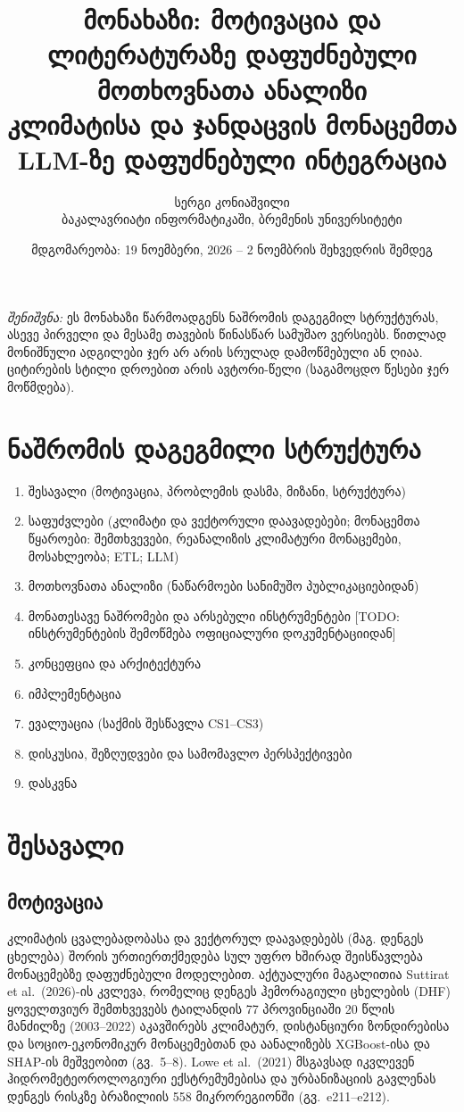\documentclass[11pt,a4paper]{article}
\title{მონახაზი: მოტივაცია და ლიტერატურაზე დაფუძნებული მოთხოვნათა ანალიზი\\[0.3em]
\large კლიმატისა და ჯანდაცვის მონაცემთა LLM-ზე დაფუძნებული ინტეგრაცია}
\author{სერგი კონიაშვილი\\ ბაკალავრიატი ინფორმატიკაში, ბრემენის უნივერსიტეტი}
\date{მდგომარეობა: 19 ნოემბერი, 2026 -- 2 ნოემბრის შეხვედრის შემდეგ}
\newcommand{\todo}[1]{\textcolor{red!70!black}{[TODO: #1]}}
\begin{document}
\maketitle

\noindent\textit{შენიშვნა:} ეს მონახაზი წარმოადგენს ნაშრომის დაგეგმილ სტრუქტურას,
ასევე პირველი და მესამე თავების წინასწარ სამუშაო ვერსიებს. წითლად მონიშნული
ადგილები ჯერ არ არის სრულად დამოწმებული ან ღიაა. ციტირების სტილი დროებით
არის ავტორი-წელი (საგამოცდო წესები ჯერ მოწმდება).

\section*{ნაშრომის დაგეგმილი სტრუქტურა}
\begin{enumerate}[nosep]
  \item შესავალი (მოტივაცია, პრობლემის დასმა, მიზანი, სტრუქტურა)
  \item საფუძვლები (კლიმატი და ვექტორული დაავადებები; მონაცემთა წყაროები:
        შემთხვევები, რეანალიზის კლიმატური მონაცემები, მოსახლეობა; ETL; LLM)
  \item მოთხოვნათა ანალიზი (ნაწარმოები სანიმუშო პუბლიკაციებიდან)
  \item მონათესავე ნაშრომები და არსებული ინსტრუმენტები \todo{ინსტრუმენტების შემოწმება ოფიციალური დოკუმენტაციიდან}
  \item კონცეფცია და არქიტექტურა
  \item იმპლემენტაცია
  \item ევალუაცია (საქმის შესწავლა CS1--CS3)
  \item დისკუსია, შეზღუდვები და სამომავლო პერსპექტივები
  \item დასკვნა
\end{enumerate}

\section{შესავალი}

\subsection{მოტივაცია}

კლიმატის ცვალებადობასა და ვექტორულ დაავადებებს (მაგ. დენგეს ცხელება) შორის
ურთიერთქმედება სულ უფრო ხშირად შეისწავლება მონაცემებზე დაფუძნებული მოდელებით.
აქტუალური მაგალითია Suttirat et al.\ (2026)-ის კვლევა, რომელიც დენგეს ჰემორაგიული
ცხელების (DHF) ყოველთვიურ შემთხვევებს ტაილანდის 77 პროვინციაში 20 წლის მანძილზე
(2003--2022) აკავშირებს კლიმატურ, დისტანციური ზონდირებისა და სოციო-ეკონომიკურ
მონაცემებთან და აანალიზებს XGBoost-ისა და SHAP-ის მეშვეობით (გვ.~5--8). Lowe et al.\
(2021) მსგავსად იკვლევენ ჰიდრომეტეოროლოგიური ექსტრემუმებისა და ურბანიზაციის
გავლენას დენგეს რისკზე ბრაზილიის 558 მიკრორეგიონში (გვ.~e211--e212).
\end{document}
